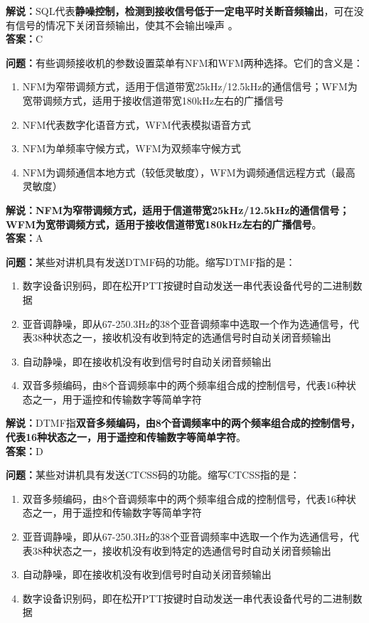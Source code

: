 \textbf{解说：}SQL代表\textbf{静噪控制，检测到接收信号低于一定电平时关断音频输出}，可在没有信号的情况下关闭音频输出，使其不会输出噪声 。\\\textbf{答案：}C



\textbf{问题：}有些调频接收机的参数设置菜单有NFM和WFM两种选择。它们的含义是：

\begin{enumerate}[label=\Alph*), leftmargin=1.5cm]
	\item NFM为窄带调频方式，适用于信道带宽25kHz/12.5kHz的通信信号；WFM为宽带调频方式，适用于接收信道带宽180kHz左右的广播信号
	\item NFM代表数字化语音方式，WFM代表模拟语音方式
	\item NFM为单频率守候方式，WFM为双频率守候方式
	\item NFM为调频通信本地方式（较低灵敏度），WFM为调频通信远程方式（最高灵敏度）
\end{enumerate}

\textbf{解说：NFM为窄带调频方式，适用于信道带宽25kHz/12.5kHz的通信信号；WFM为宽带调频方式，适用于接收信道带宽180kHz左右的广播信号}。\\\textbf{答案：}A



\textbf{问题：}某些对讲机具有发送DTMF码的功能。缩写DTMF指的是：

\begin{enumerate}[label=\Alph*), leftmargin=1.5cm]
	\item 数字设备识别码，即在松开PTT按键时自动发送一串代表设备代号的二进制数据
	\item 亚音调静噪，即从67-250.3Hz的38个亚音调频率中选取一个作为选通信号，代表38种状态之一，接收机没有收到特定的选通信号时自动关闭音频输出	
	\item 自动静噪，即在接收机没有收到信号时自动关闭音频输出
	\item 双音多频编码，由8个音调频率中的两个频率组合成的控制信号，代表16种状态之一，用于遥控和传输数字等简单字符
\end{enumerate}

\textbf{解说：}DTMF指\textbf{双音多频编码，由8个音调频率中的两个频率组合成的控制信号，代表16种状态之一，用于遥控和传输数字等简单字符}。\\\textbf{答案：}D



\textbf{问题：}某些对讲机具有发送CTCSS码的功能。缩写CTCSS指的是：

\begin{enumerate}[label=\Alph*), leftmargin=1.5cm]
	\item 双音多频编码，由8个音调频率中的两个频率组合成的控制信号，代表16种状态之一，用于遥控和传输数字等简单字符
	\item 亚音调静噪，即从67-250.3Hz的38个亚音调频率中选取一个作为选通信号，代表38种状态之一，接收机没有收到特定的选通信号时自动关闭音频输出
	\item 自动静噪，即在接收机没有收到信号时自动关闭音频输出
	\item 数字设备识别码，即在松开PTT按键时自动发送一串代表设备代号的二进制数据
\end{enumerate}

